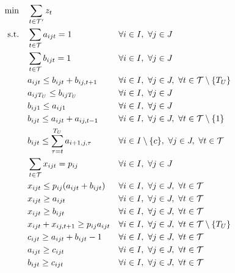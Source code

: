\documentclass[11pt]{article}
\begin{document}
\begin{subequations}\label{eq:relaxed-model}
\begin{align}
\min\quad & \sum_{t \in \mathcal{T}'} z_t \label{eq:obj}\\
\textnormal{s.t.}\quad
& \sum_{t \in \mathcal{T}} a_{ijt} = 1 && \forall i\in I,\ \forall j\in J 
\label{eq:start-one}\\
& \sum_{t \in \mathcal{T}} b_{ijt} = 1 && \forall i\in I,\ \forall j\in J 
\label{eq:end-one}\\
& a_{ijt} \le b_{ijt}+b_{ij,t+1} && \forall i\in I,\ \forall j\in J,\ \forall t \in \mathcal{T} \setminus \{T_U\}
\label{eq:adjacent-1}\\
& a_{ijT_U} \le b_{ijT_U} && \forall i\in I,\ \forall j\in J 
\label{eq:adjacent-2}\\
& b_{ij1} \le a_{ij1} && \forall i\in I,\ \forall j\in J
\label{eq:sym-adjacent-1}\\
& b_{ijt} \le a_{ijt}+a_{ij,t-1} && \forall i\in I,\ \forall j\in J,\ \forall t \in \mathcal{T} \setminus \{1\}
\label{eq:sym-adjacent-2}\\
& b_{ijt} \le \sum_{\tau=t}^{T_U} a_{i+1,j,\tau} && \forall i \in I \setminus \{c\},\ \forall j\in J,\ \forall t \in \mathcal{T} 
\label{eq:precedence-bucket}\\
& \sum_{t \in \mathcal{T}} x_{ijt} = p_{ij} && \forall i\in I,\ \forall j\in J 
\label{eq:processing-conservation}\\
& x_{ijt} \le p_{ij}(a_{ijt}+b_{ijt}) && \forall i\in I,\ \forall j\in J,\ \forall t \in \mathcal{T}
\label{eq:bucket-activation}\\
& x_{ijt} \ge a_{ijt} && \forall i\in I,\ \forall j\in J,\ \forall t \in \mathcal{T} 
\label{eq:positive-start}\\
& x_{ijt} \ge b_{ijt} && \forall i\in I,\ \forall j\in J,\ \forall t \in \mathcal{T} 
\label{eq:positive-end}\\
& x_{ijt} + x_{ij,t+1} \geq p_{ij} a_{ijt} && \forall i \in I, \ \forall j \in J, \ \forall t \in \mathcal{T} \setminus \{T_U\}
\label{eq:consec-x-a-relationship} \\
& c_{ijt} \ge a_{ijt} + b_{ijt} - 1 && \forall i \in I, \ \forall j \in J,   \ \forall t \in \mathcal{T}
\label{eq:c-def1} \\ 
& a_{ijt} \ge c_{ijt} && \forall i \in I, \ \forall j \in J, \ \forall t \in \mathcal{T}
\label{eq:c-def2} \\
& b_{ijt} \ge c_{ijt} && \forall i \in I, \ \forall j \in J, \ \forall t \in \mathcal{T}
\label{eq:c-def3} \\

\end{align}
\end{subequations}
\end{document}
